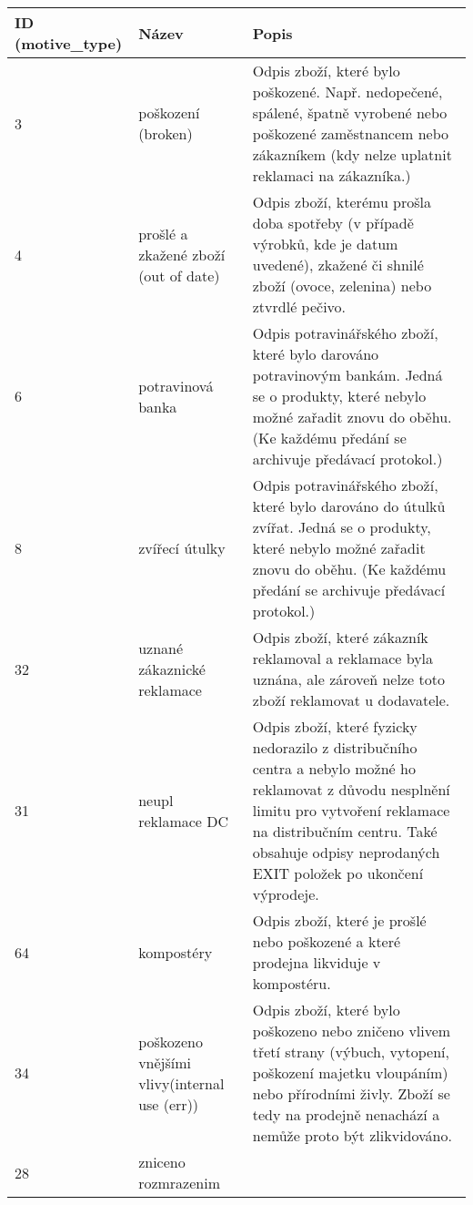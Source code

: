 \begin{table}[]
    \begin{tabular}{l l p{7cm}}
        ID (motive\_type) & Název             & Popis \\
    \hline
    3            & poškození (broken)                 & Odpis zboží, které bylo poškozené. Např. nedopečené, spálené, špatně vyrobené nebo poškozené zaměstnancem nebo zákazníkem (kdy nelze uplatnit reklamaci na zákazníka.)       \\
    4            & prošlé a zkažené zboží (out of date)            & Odpis zboží, kterému prošla doba spotřeby (v případě výrobků, kde je datum uvedené), zkažené či shnilé zboží (ovoce, zelenina) nebo ztvrdlé pečivo.       \\
    6            & potravinová banka      & Odpis potravinářského zboží, které bylo darováno potravinovým bankám. Jedná se o produkty, které nebylo možné zařadit znovu do oběhu. (Ke každému předání se archivuje předávací protokol.)     \\
    8            & zvířecí útulky              & Odpis potravinářského zboží, které bylo darováno do útulků zvířat. Jedná se o produkty, které nebylo možné zařadit znovu do oběhu.  (Ke každému předání se archivuje předávací protokol.)          \\
    32           & uznané zákaznické reklamace   & Odpis zboží, které zákazník reklamoval a reklamace byla uznána, ale zároveň nelze toto zboží reklamovat u dodavatele.      \\
    31           & neupl reklamace DC    &  Odpis zboží, které fyzicky nedorazilo z distribučního centra a nebylo možné ho reklamovat z důvodu nesplnění limitu pro vytvoření reklamace na distribučním centru. Také obsahuje odpisy neprodaných EXIT položek po ukončení výprodeje.     \\
    64           & kompostéry             & Odpis zboží, které je prošlé nebo poškozené a které prodejna likviduje v kompostéru.       \\
    34           & poškozeno vnějšími vlivy(internal use (err))
    & Odpis zboží, které bylo poškozeno nebo zničeno vlivem třetí strany (výbuch, vytopení, poškození majetku vloupáním) nebo přírodními živly. Zboží se tedy na prodejně nenachází a nemůže proto být zlikvidováno.      \\
    28           & zniceno rozmrazenim    &       \\
    \end{tabular}
\end{table}




